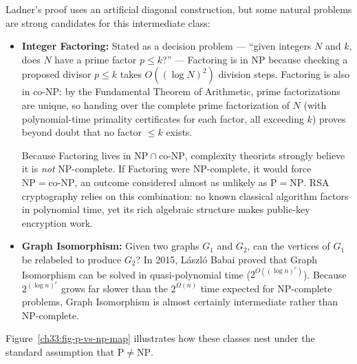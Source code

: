 Ladner's proof uses an artificial diagonal construction, but some natural problems are strong candidates for this intermediate class:
\begin{itemize}
  \item \textbf{Integer Factoring:} Stated as a decision problem --- ``given integers $N$ and $k$, does $N$ have a prime factor $p \le k$?'' --- Factoring is in $\mathrm{NP}$ because checking a proposed divisor $p \le k$ takes $O((\log N)^2)$ division steps. Factoring is also in $\mathrm{co\text{-}NP}$: by the Fundamental Theorem of Arithmetic, prime factorizations are unique, so handing over the complete prime factorization of $N$ (with polynomial-time primality certificates for each factor, all exceeding $k$) proves beyond doubt that no factor $\le k$ exists.

        Because Factoring lives in $\mathrm{NP} \cap \mathrm{co\text{-}NP}$, complexity theorists strongly believe it is \emph{not} $\mathrm{NP}$-complete. If Factoring were $\mathrm{NP}$-complete, it would force $\mathrm{NP} = \mathrm{co\text{-}NP}$, an outcome considered almost as unlikely as $\mathrm{P} = \mathrm{NP}$. RSA cryptography relies on this combination: no known classical algorithm factors in polynomial time, yet its rich algebraic structure makes public-key encryption work.
  \item \textbf{Graph Isomorphism:} Given two graphs $G_1$ and $G_2$, can the vertices of $G_1$ be relabeled to produce $G_2$? In 2015, L\'aszl\'o Babai proved that Graph Isomorphism can be solved in quasi-polynomial time ($2^{O((\log n)^c)}$). Because $2^{(\log n)^c}$ grows far slower than the $2^{\Omega(n)}$ time expected for $\mathrm{NP}$-complete problems, Graph Isomorphism is almost certainly intermediate rather than $\mathrm{NP}$-complete.
\end{itemize}

Figure~\ref{ch33:fig-p-vs-np-map} illustrates how these classes nest under the standard assumption that $\mathrm{P} \neq \mathrm{NP}$.

